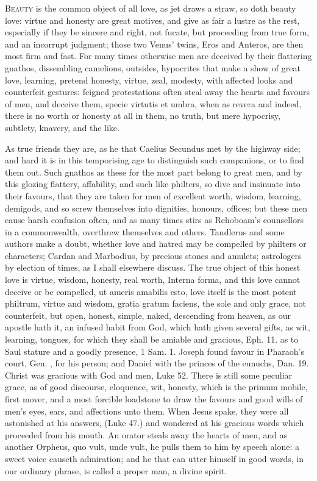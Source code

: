 {\lettrine{B}{eauty} is the common object of all love, as jet draws a straw, so
doth beauty love: virtue and honesty are great motives, and give as
fair a lustre as the rest, especially if they be sincere and right, not
fucate, but proceeding from true form, and an incorrupt judgment; those
two Venus' twins, Eros and Anteros, are then most firm and fast. For
many times otherwise men are deceived by their flattering gnathos,
dissembling camelions, outsides, hypocrites that make a show of great
love, learning, pretend honesty, virtue, zeal, modesty, with affected
looks and counterfeit gestures: feigned protestations often steal away
the hearts and favours of men, and deceive them, specie virtutis et
umbra, when as revera and indeed, there is no worth or honesty at all
in them, no truth, but mere hypocrisy, subtlety, knavery, and the like.

As true friends they are, as he that Caelius Secundus met by the
highway side; and hard it is in this temporising age to distinguish
such companions, or to find them out. Such gnathos as these for the
most part belong to great men, and by this glozing flattery,
affability, and such like philters, so dive and insinuate into their
favours, that they are taken for men of excellent worth, wisdom,
learning, demigods, and so screw themselves into dignities, honours,
offices; but these men cause harsh confusion often, and as many times
stirs as Rehoboam's counsellors in a commonwealth, overthrew themselves
and others. Tandlerus and some authors make a doubt, whether love and
hatred may be compelled by philters or characters; Cardan and
Marbodius, by precious stones and amulets; astrologers by election of
times, \etc{} as I shall elsewhere discuss. The true object of this
honest love is virtue, wisdom, honesty, real worth, Interna
forma, and this love cannot deceive or be compelled, ut ameris amabilis
esto, love itself is the most potent philtrum, virtue and wisdom,
gratia gratum faciens, the sole and only grace, not counterfeit, but
open, honest, simple, naked, descending from heaven, as our
apostle hath it, an infused habit from God, which hath given several
gifts, as wit, learning, tongues, for which they shall be amiable and
gracious, Eph.  11. as to Saul stature and a goodly presence, 1 Sam.
 1. Joseph found favour in Pharaoh's court, Gen. , for
his person; and Daniel with the princes of the eunuchs, Dan. 
19. Christ was gracious with God and men, Luke  52. There is still
some peculiar grace, as of good discourse, eloquence, wit, honesty,
which is the primum mobile, first mover, and a most forcible loadstone
to draw the favours and good wills of men's eyes, ears, and affections
unto them. When Jesus spake, they were all astonished at his answers,
(Luke  47.) and wondered at his gracious words which proceeded from
his mouth. An orator steals away the hearts of men, and as another
Orpheus, quo vult, unde vult, he pulls them to him by speech alone: a
sweet voice causeth admiration; and he that can utter himself in good
words, in our ordinary phrase, is called a proper man, a divine spirit.

}
